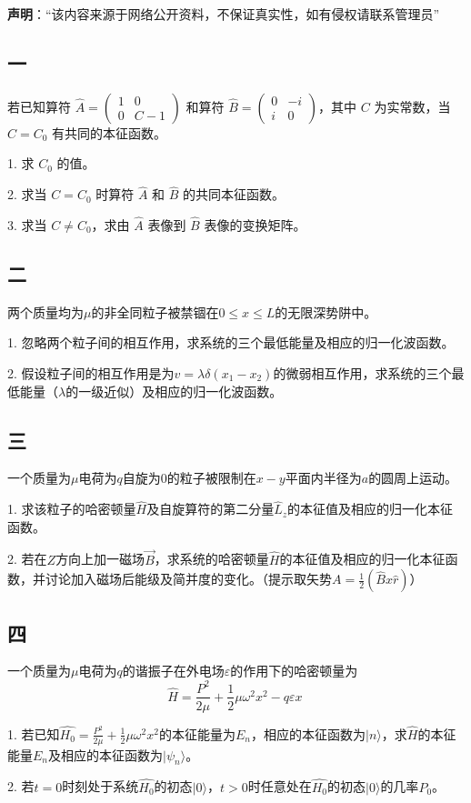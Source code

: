 
\textbf{声明}：“该内容来源于网络公开资料，不保证真实性，如有侵权请联系管理员”

\subsection{一}
若已知算符 $\hat{A} = \begin{pmatrix}
1 & 0 \\
0 & C - 1
\end{pmatrix}$ 和算符 $\hat{B} = \begin{pmatrix}
0 & -i \\
i & 0
\end{pmatrix}$，其中 $C$ 为实常数，当 $C = C_0$ 有共同的本征函数。

1. 求 $C_0$ 的值。

2. 求当 $C = C_0$ 时算符 $\hat{A}$ 和 $\hat{B}$ 的共同本征函数。

3. 求当 $C \neq C_0$，求由 $\hat{A}$ 表像到 $\hat{B}$ 表像的变换矩阵。

\subsection{二}
两个质量均为$\mu$的非全同粒子被禁锢在$0 \le x \le L$的无限深势阱中。

1. 忽略两个粒子间的相互作用，求系统的三个最低能量及相应的归一化波函数。

2. 假设粒子间的相互作用是为$v = \lambda \delta (x_1 - x_2)$的微弱相互作用，求系统的三个最低能量（$\lambda$的一级近似）及相应的归一化波函数。

\subsection{三}
一个质量为$\mu$电荷为$q$自旋为$0$的粒子被限制在$x-y$平面内半径为$a$的圆周上运动。

1. 求该粒子的哈密顿量$\hat H$及自旋算符的第二分量$\hat{L}_z$的本征值及相应的归一化本征函数。

2. 若在$Z$方向上加一磁场$\vec{B}$，求系统的哈密顿量$\hat{H}$的本征值及相应的归一化本征函数，并讨论加入磁场后能级及简并度的变化。（提示取矢势$A=\frac{1}{2}(\hat{B} x\hat{r})$）

\subsection{四}
一个质量为$\mu$电荷为$q$的谐振子在外电场$\varepsilon$的作用下的哈密顿量为
$$\hat{H} = \frac{P^2}{2\mu} + \frac{1}{2}\mu \omega^2 x^2 - q \varepsilon x~$$

1. 若已知$\hat{H_0} = \frac{P^2}{2\mu} + \frac{1}{2}\mu \omega^2 x^2$的本征能量为$E_n$，相应的本征函数为$|n\rangle$，求$\hat{H}$的本征能量$E_n$及相应的本征函数为$|\psi_n\rangle$。

2. 若$t=0$时刻处于系统$\hat{H_0}$的初态$|0\rangle$，$t>0$时任意处在$\hat{H_0}$的初态$|0\rangle$的几率$P_0$。
